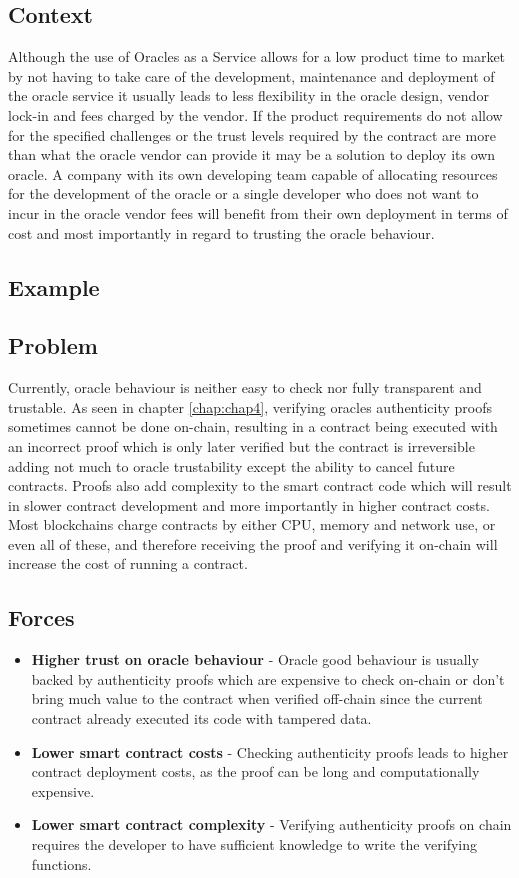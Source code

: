 \subsection{Context}
Although the use of Oracles as a Service allows for a low product time to market by not having to take care of the development, maintenance and deployment of the oracle service it usually leads to less flexibility in the oracle design, vendor lock-in and fees charged by the vendor. If the product requirements do not allow for the specified challenges or the trust levels required by the contract are more than what the oracle vendor can provide it may be a solution to deploy its own oracle. A company with its own developing team capable of allocating resources for the development of the oracle or a single developer who does not want to incur in the oracle vendor fees will benefit from their own deployment in terms of cost and most importantly in regard to trusting the oracle behaviour.

\subsection{Example}


\subsection{Problem}
Currently, oracle behaviour is neither easy to check nor fully transparent and trustable. As seen in chapter \ref{chap:chap4}, verifying oracles authenticity proofs sometimes cannot be done on-chain, resulting in a contract being executed with an incorrect proof which is only later verified but the contract is irreversible adding not much to oracle trustability except the ability to cancel future contracts. Proofs also add complexity to the smart contract code which will result in slower contract development and more importantly in higher contract costs. Most blockchains charge contracts by either CPU, memory and network use, or even all of these, and therefore receiving the proof and verifying it on-chain will increase the cost of running a contract.

\subsection{Forces}
\begin{itemize}
  \item \textbf{Higher trust on oracle behaviour} - Oracle good behaviour is usually backed by authenticity proofs which are expensive to check on-chain or don't bring much value to the contract when verified off-chain since the current contract already executed its code with tampered data.
  \item \textbf{Lower smart contract costs} - Checking authenticity proofs leads to higher contract deployment costs, as the proof can be long and computationally expensive.
  \item \textbf{Lower smart contract complexity} - Verifying authenticity proofs on chain requires the developer to have sufficient knowledge to write the verifying functions.
\end{itemize}

